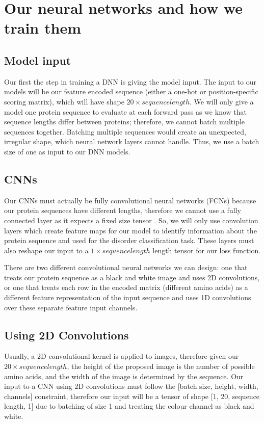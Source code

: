 \documentclass{l4proj}
\begin{document}
\section{Our neural networks and how we train them}

\subsection{Model input}

Our first the step in training a DNN is giving the model input. The input to our models will be our feature encoded sequence (either a one-hot or position-specific scoring matrix), which will have shape $20\times sequence length$. We will only give a model one protein sequence to evaluate at each forward pass as we know that sequence lengths differ between proteins; therefore, we cannot batch multiple sequences together. Batching multiple sequences would create an unexpected, irregular shape, which neural network layers cannot handle. Thus, we use a batch size of one as input to our DNN models.

\subsection{CNNs}
\label{chap:design section:cnn}

Our CNNs must actually be fully convolutional neural networks (FCNs) because our protein sequences have different lengths, therefore we cannot use a fully connected layer as it expects a fixed size tensor \citep{fcn_seg}. So, we will only use convolution layers which create feature maps for our model to identify information about the protein sequence and used for the disorder classification task. These layers must also reshape our input to a $1\times sequence length$ length tensor for our loss function.

There are two different convolutional neural networks we can design: one that treats our protein sequence as a black and white image and uses 2D convolutions, or one that treats each row in the encoded matrix (different amino acids) as a different feature representation of the input sequence and uses 1D convolutions over these separate feature input channels. 

\subsection*{Using 2D Convolutions}

Usually, a 2D convolutional kernel is applied to images, therefore given our $20\times sequence length$, the height of the proposed image is the number of possible amino acids, and the width of the image is determined by the sequence. Our input to a CNN using 2D convolutions must follow the [batch size, height, width, channels] constraint, therefore our input will be a tensor of shape [1, 20, sequence length, 1] due to batching of size 1 and treating the colour channel as black and white. 
\end{document}
